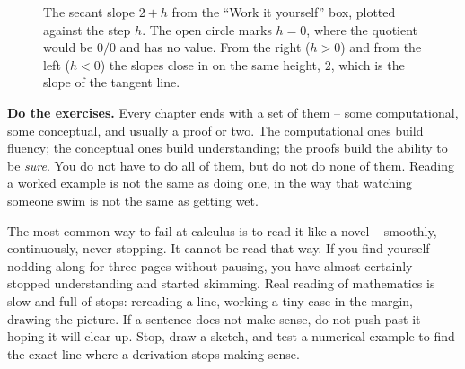 \begin{figure}[htbp]
\centering
{}
\caption{The secant slope $2+h$ from the ``Work it yourself'' box, plotted against the step $h$. The open
circle marks $h=0$, where the quotient would be $0/0$ and has no value. From the right ($h>0$) and from the
left ($h<0$) the slopes close in on the same height, $2$, which is the slope of the tangent line.}
\label{ch00:closing-in}
\end{figure}

\textbf{Do the exercises.} Every chapter ends with a set of them -- some computational, some
conceptual, and usually a proof or two. The computational ones build fluency; the conceptual ones
build understanding; the proofs build the ability to be \emph{sure}. You do not have to do all of
them, but do not do none of them. Reading a worked example
is not the same as doing one, in the way that watching someone swim is not
the same as getting wet.

\begin{trapbox}
The most common way to fail at calculus is to read it like a novel -- smoothly, continuously, never
stopping. It cannot be read that way. If you find yourself nodding along for three pages without
pausing, you have almost certainly stopped understanding and started skimming. Real reading of
mathematics is slow and full of stops: rereading a line, working a tiny case in the margin, drawing
the picture. If a sentence does not make sense, do not push past it hoping it will clear up. Stop,
draw a sketch, and test a numerical example to find the exact line where a derivation stops making sense.
\end{trapbox}

